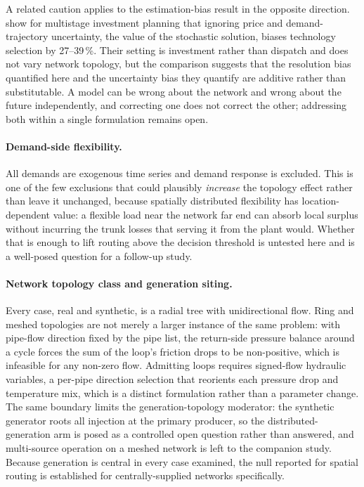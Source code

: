 A related caution applies to the estimation-bias result in the opposite direction.
\citet{Koek2026} show for multistage investment planning that ignoring price and
demand-trajectory uncertainty, the value of the stochastic solution, biases technology
selection by 27--39\,\%. Their setting is investment rather than dispatch and does not
vary network topology, but the comparison suggests that the resolution bias quantified
here and the uncertainty bias they quantify are additive rather than substitutable. A
model can be wrong about the network and wrong about the future independently, and
correcting one does not correct the other; addressing both within a single formulation
remains open.

\paragraph{Demand-side flexibility.}
All demands are exogenous time series and demand response is excluded. This is one of the
few exclusions that could plausibly \emph{increase} the topology effect rather than leave
it unchanged, because spatially distributed flexibility has location-dependent value: a
flexible load near the network far end can absorb local surplus without incurring the
trunk losses that serving it from the plant would. Whether that is enough to lift routing
above the decision threshold is untested here and is a well-posed question for a follow-up
study.

\paragraph{Network topology class and generation siting.}
Every case, real and synthetic, is a radial tree with unidirectional flow. Ring and meshed
topologies are not merely a larger instance of the same problem: with pipe-flow direction
fixed by the pipe list, the return-side pressure balance around a cycle forces the sum of
the loop's friction drops to be non-positive, which is infeasible for any non-zero flow.
Admitting loops requires signed-flow hydraulic variables, a per-pipe direction selection
that reorients each pressure drop and temperature mix, which is a distinct formulation
rather than a parameter change. The same boundary limits the generation-topology
moderator: the synthetic generator roots all injection at the primary producer, so the
distributed-generation arm is posed as a controlled open question rather than answered,
and multi-source operation on a meshed network is left to the companion study. Because
generation is central in every case examined, the null reported for spatial routing is
established for centrally-supplied networks specifically.

